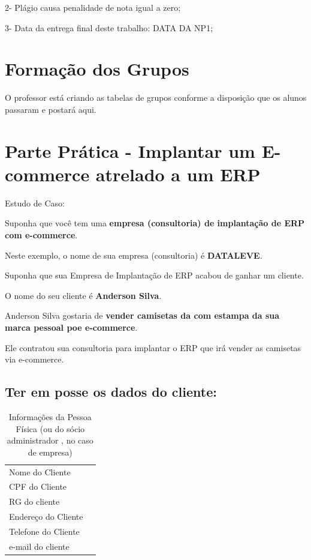 \documentclass[
]{book}
\begin{document}
2- Plágio causa penalidade de nota igual a zero;

3- Data da entrega final deste trabalho: DATA DA NP1;

\section{Formação dos Grupos}\label{formauxe7uxe3o-dos-grupos}

O professor está criando as tabelas de grupos conforme a disposição que os alunos passaram e postará aqui.

\section{Parte Prática - Implantar um E-commerce atrelado a um ERP}\label{parte-pruxe1tica---implantar-um-e-commerce-atrelado-a-um-erp}

Estudo de Caso:

Suponha que você tem uma \textbf{empresa (consultoria) de implantação de ERP com e-commerce}.

Neste exemplo, o nome de sua empresa (consultoria) é \textbf{DATALEVE}.

Suponha que sua Empresa de Implantação de ERP acabou de ganhar um cliente.

O nome do seu cliente é \textbf{Anderson Silva}.

Anderson Silva gostaria de \textbf{vender camisetas da com estampa da sua marca pessoal poe e-commerce}.

Ele contratou sua consultoria para implantar o ERP que irá vender as camisetas via e-commerce.

\subsection{Ter em posse os dados do cliente:}\label{ter-em-posse-os-dados-do-cliente}

\begin{longtable}[]{@{}ll@{}}
\caption{Informações da Pessoa Física (ou do sócio administrador , no caso de empresa)}\tabularnewline
\toprule\noalign{}
\endfirsthead
\endhead
\bottomrule\noalign{}
\endlastfoot
Nome do Cliente & \\
CPF do Cliente & \\
RG do cliente & \\
Endereço do Cliente & \\
Telefone do Cliente & \\
e-mail do cliente & \\
\end{longtable}
\end{document}
